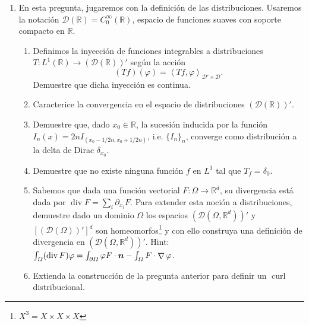 \documentclass{article}
\renewcommand{\vec}{\vectorsym}
\DeclareMathOperator{\grad}{\nabla}
\DeclareMathOperator{\dive}{\text{div}}
\DeclareMathOperator{\curl}{\text{curl}}
\newcommand{\R}{\mathbb{R}}
\newcommand{\pts}[1]{[{\bf #1 puntos}] }
\begin{document}
\begin{enumerate}
    \item En esta pregunta, jugaremos con la definición de las distribuciones. Usaremos la notación $\mathcal D(\R) = C_0^\infty(\R)$, espacio de funciones suaves con soporte compacto en $\R$.
        \begin{enumerate}
            \item\pts{1} Definimos la inyección de funciones integrables a distribuciones $T:L^1(\R) \to \left(\mathcal D(\R)\right)'$ según la acción
                $$ (Tf)(\varphi)  = \left\langle Tf, \varphi\right\rangle_{\mathcal D'\times \mathcal D}.$$
                Demuestre que dicha inyección es continua. 
            \item\pts{1}Caracterice la convergencia en el espacio de distribuciones $\left(\mathcal D(\R)\right)'$. 
            \item\pts{1}Demuestre que, dado $x_0\in \R$,  la sucesión inducida por la función $I_n(x) = 2nI_{(x_0-1/2n, x_0+1/2n)}$, i.e. $\{I_n\}_n$, converge como distribución a la delta de Dirac $\delta_{x_0}$. 
            \item\pts{1}Demuestre que no existe ninguna función $f$ en $L^1$ tal que $T_f = \delta_0$. 
            \item\pts{2} Sabemos que dada una función vectorial $F:\Omega \to \R^d$, su divergencia está dada por $\dive F=\sum_i \partial_{x_i}F$. Para extender esta noción a distribuciones, demuestre dado un dominio $\Omega$ los espacios $(\mathcal D(\Omega, \R^d))'$ y $[(\mathcal D(\Omega))']^d$ son homeomorfos\footnote{$X^3 = X\times X\times X$} y con ello construya una definición de divergencia en $(\mathcal D(\Omega, \R^d))'$. Hint: $\int_\Omega (\dive F)\varphi = \int_{\partial\Omega} \varphi F\cdot \vec n - \int_\Omega F\cdot \grad \varphi$. 
            \item\pts{2} Extienda la construcción de la pregunta anterior para definir un $\curl$ distribucional.
        \end{enumerate}
\end{enumerate}

\end{document}
